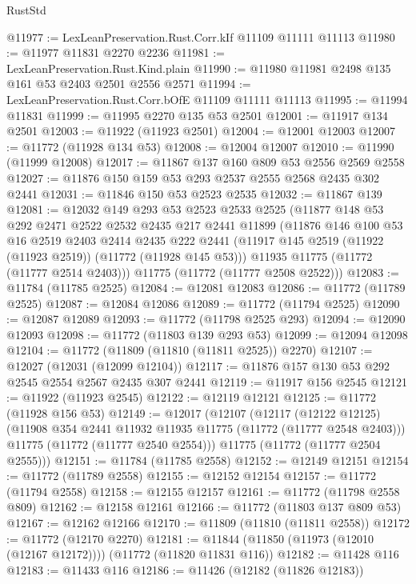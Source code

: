 \begin{lexlean}{RustStd}
\begin{coremodule}
@11977 := LexLeanPreservation.Rust.Corr.kIf @11109 @11111 @11113
@11980 := @11977 @11831 @2270 @2236
@11981 := LexLeanPreservation.Rust.Kind.plain
@11990 := @11980 @11981 @2498 @135 @161 @53 @2403 @2501 @2556 @2571
@11994 := LexLeanPreservation.Rust.Corr.bOfE @11109 @11111 @11113
@11995 := @11994 @11831
@11999 := @11995 @2270 @135 @53 @2501
@12001 := @11917 @134 @2501
@12003 := @11922 (@11923 @2501)
@12004 := @12001 @12003
@12007 := @11772 (@11928 @134 @53)
@12008 := @12004 @12007
@12010 := @11990 (@11999 @12008)
@12017 := @11867 @137 @160 @809 @53 @2556 @2569 @2558
@12027 := @11876 @150 @159 @53 @293 @2537 @2555 @2568 @2435 @302 @2441
@12031 := @11846 @150 @53 @2523 @2535
@12032 := @11867 @139
@12081 := @12032
    @149
    @293
    @53
    @2523
    @2533
    @2525
    (@11877
      @148
      @53
      @292
      @2471
      @2522
      @2532
      @2435
      @217
      @2441
      @11899
      (@11876
        @146
        @100
        @53
        @16
        @2519
        @2403
        @2414
        @2435
        @222
        @2441
        (@11917 @145 @2519 (@11922 (@11923 @2519)) (@11772 (@11928 @145 @53)))
        @11935
        @11775
        (@11772 (@11777 @2514 @2403)))
      @11775
      (@11772 (@11777 @2508 @2522)))
@12083 := @11784 (@11785 @2525)
@12084 := @12081 @12083
@12086 := @11772 (@11789 @2525)
@12087 := @12084 @12086
@12089 := @11772 (@11794 @2525)
@12090 := @12087 @12089
@12093 := @11772 (@11798 @2525 @293)
@12094 := @12090 @12093
@12098 := @11772 (@11803 @139 @293 @53)
@12099 := @12094 @12098
@12104 := @11772 (@11809 (@11810 (@11811 @2525)) @2270)
@12107 := @12027 (@12031 (@12099 @12104))
@12117 := @11876 @157 @130 @53 @292 @2545 @2554 @2567 @2435 @307 @2441
@12119 := @11917 @156 @2545
@12121 := @11922 (@11923 @2545)
@12122 := @12119 @12121
@12125 := @11772 (@11928 @156 @53)
@12149 := @12017
    (@12107
      (@12117
        (@12122 @12125)
        (@11908 @354 @2441 @11932 @11935 @11775 (@11772 (@11777 @2548 @2403)))
        @11775
        (@11772 (@11777 @2540 @2554)))
      @11775
      (@11772 (@11777 @2504 @2555)))
@12151 := @11784 (@11785 @2558)
@12152 := @12149 @12151
@12154 := @11772 (@11789 @2558)
@12155 := @12152 @12154
@12157 := @11772 (@11794 @2558)
@12158 := @12155 @12157
@12161 := @11772 (@11798 @2558 @809)
@12162 := @12158 @12161
@12166 := @11772 (@11803 @137 @809 @53)
@12167 := @12162 @12166
@12170 := @11809 (@11810 (@11811 @2558))
@12172 := @11772 (@12170 @2270)
@12181 := @11844 (@11850 (@11973 (@12010 (@12167 @12172)))) (@11772 (@11820 @11831 @116))
@12182 := @11428 @116
@12183 := @11433 @116
@12186 := @11426 (@12182 (@11826 @12183))

\end{coremodule}
\end{lexlean}
